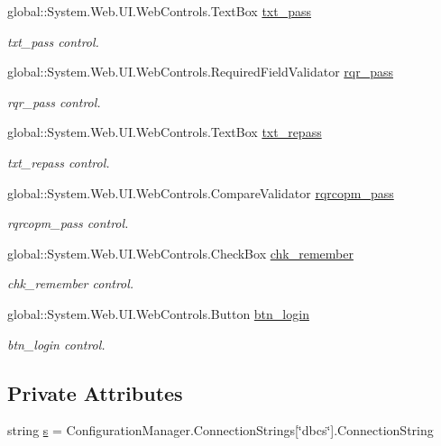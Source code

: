 \begin{DoxyCompactItemize}
global\+::\+System.\+Web.\+U\+I.\+Web\+Controls.\+Text\+Box \mbox{\hyperlink{classlogin_aef922cd4200cc949cef8d65d63d986ff}{txt\+\_\+pass}}
\begin{DoxyCompactList}\small\item\em txt\+\_\+pass control. \end{DoxyCompactList}\item 
global\+::\+System.\+Web.\+U\+I.\+Web\+Controls.\+Required\+Field\+Validator \mbox{\hyperlink{classlogin_ab063bafd472475a635a1f8df22f79955}{rqr\+\_\+pass}}
\begin{DoxyCompactList}\small\item\em rqr\+\_\+pass control. \end{DoxyCompactList}\item 
global\+::\+System.\+Web.\+U\+I.\+Web\+Controls.\+Text\+Box \mbox{\hyperlink{classlogin_ab0c31481e73eaec76f425b82ad612957}{txt\+\_\+repass}}
\begin{DoxyCompactList}\small\item\em txt\+\_\+repass control. \end{DoxyCompactList}\item 
global\+::\+System.\+Web.\+U\+I.\+Web\+Controls.\+Compare\+Validator \mbox{\hyperlink{classlogin_a639af5216828efa3292806bfaa3c140f}{rqrcopm\+\_\+pass}}
\begin{DoxyCompactList}\small\item\em rqrcopm\+\_\+pass control. \end{DoxyCompactList}\item 
global\+::\+System.\+Web.\+U\+I.\+Web\+Controls.\+Check\+Box \mbox{\hyperlink{classlogin_a954d3486d679c27354627843b38b771e}{chk\+\_\+remember}}
\begin{DoxyCompactList}\small\item\em chk\+\_\+remember control. \end{DoxyCompactList}\item 
global\+::\+System.\+Web.\+U\+I.\+Web\+Controls.\+Button \mbox{\hyperlink{classlogin_aa77bd8617de6dd15c10a444e406e2c98}{btn\+\_\+login}}
\begin{DoxyCompactList}\small\item\em btn\+\_\+login control. \end{DoxyCompactList}\end{DoxyCompactItemize}
\subsection*{Private Attributes}
\begin{DoxyCompactItemize}
\item 
string \mbox{\hyperlink{classlogin_a75f80599c75c0bf309dd1d3cf87c6e6e}{s}} = Configuration\+Manager.\+Connection\+Strings\mbox{[}\char`\"{}dbcs\char`\"{}\mbox{]}.Connection\+String
\end{DoxyCompactItemize}


